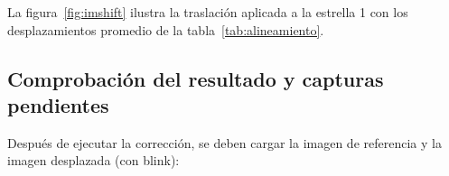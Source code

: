 \documentclass[11pt,a4paper]{article}
\begin{document}
La figura~\ref{fig:imshift} ilustra la traslación aplicada a la estrella 1
con los desplazamientos promedio de la tabla~\ref{tab:alineamiento}.



\subsection{Comprobación del resultado y capturas pendientes}
Después de ejecutar la corrección, se deben cargar la imagen de referencia
y la imagen desplazada (con blink):






\end{document}
